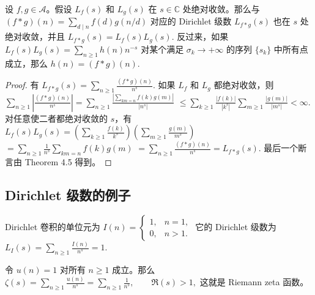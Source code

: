 \begin{theorem}[原文 Theorem 4.6]
	设 $f,g\in\mathcal A$。假设 $L_f(s)$ 和 $L_g(s)$ 在 $s\in\mathbb C$ 处绝对收敛。那么与
	\(\textstyle (f*g)(n)=\allowbreak{}\sum_{d\mid\allowbreak{} n}f(d)g(n/d)\)
	对应的 Dirichlet 级数 $L_{f*g}(s)$ 也在 $s$ 处绝对收敛，并且
	\(\textstyle L_{f*g}(s)=\allowbreak{}L_f(s)L_g(s).\)
	反过来，如果
	\(\textstyle L_f(s)L_g(s)=\allowbreak{}\sum_{n\geq\allowbreak{} 1}h(n)n^{-s}\)
	对某个满足 $\sigma_k\to+\infty$ 的序列 $\{s_k\}$ 中所有点成立，那么
	\(\textstyle h(n)=\allowbreak{}(f*g)(n).\)
\end{theorem}

\begin{proof}
	有
	\(\textstyle L_{f*g}(s)=\allowbreak{}\sum_{n\geq\allowbreak{} 1}\frac{(f*g)(n)}{n^s}.\)
	如果 $L_f$ 和 $L_g$ 都绝对收敛，则
	\(\textstyle \sum_{n\geq\allowbreak{} 1}\left|\frac{(f*g)(n)}{n^s}\right| =\allowbreak{} \sum_{n\geq\allowbreak{} 1} \frac{\left|\sum_{km=\allowbreak{}n}f(k)g(m)\right|}{|n^s|}\) \(\textstyle \leq\allowbreak{} \sum_{k\geq\allowbreak{} 1}\frac{|f(k)|}{|k^s|} \sum_{m\geq\allowbreak{} 1}\frac{|g(m)|}{|m^s|} <\infty.\)
	对任意使二者都绝对收敛的 $s$，有
	\(\textstyle L_f(s)L_g(s) =\allowbreak{} \left(\sum_{k\geq\allowbreak{} 1}\frac{f(k)}{k^s}\right) \left(\sum_{m\geq\allowbreak{} 1}\frac{g(m)}{m^s}\right)\) \(\textstyle =\allowbreak{} \sum_{n\geq\allowbreak{} 1}\frac1{n^s}\sum_{km=\allowbreak{}n}f(k)g(m)\) \(\textstyle =\allowbreak{} \sum_{n\geq\allowbreak{} 1}\frac{(f*g)(n)}{n^s} =\allowbreak{} L_{f*g}(s).\)
	最后一个断言由 Theorem 4.5 得到。
\end{proof}

\subsection*{Dirichlet 级数的例子}

\begin{example}
	Dirichlet 卷积的单位元为
	\(\textstyle I(n)= \begin{cases} 1, & n=1,\\ 0, & n>1. \end{cases}\)
	它的 Dirichlet 级数为
	\(\textstyle L_I(s)=\allowbreak{}\sum_{n\geq\allowbreak{} 1}\frac{I(n)}{n^s}=\allowbreak{}1.\)
\end{example}

\begin{example}
	令 $u(n)=1$ 对所有 $n\geq 1$ 成立。那么
	\(\textstyle \zeta(s)=\allowbreak{}\sum_{n\geq\allowbreak{} 1}\frac{u(n)}{n^s} =\allowbreak{} \sum_{n\geq\allowbreak{} 1}\frac1{n^s},\allowbreak{} \qquad \Re(s)>1,\allowbreak{}\)
	这就是 Riemann zeta 函数。
\end{example}

